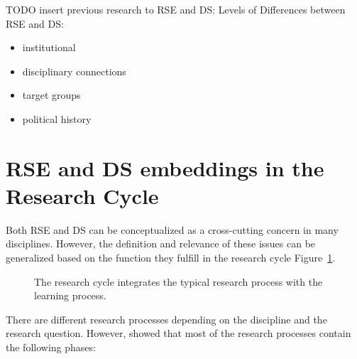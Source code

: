 \documentclass[
        english,biblatex
    ]{lni}
\providecommand{\tightlist}{%
    \setlength{\itemsep}{0pt}\setlength{\parskip}{0pt}}
\begin{document}
    TODO insert previous research to RSE and DS: Levels of Differences
    between RSE and DS:

    \begin{itemize}
    \tightlist
    \item
      institutional
    \item
      disciplinary connections
    \item
      target groups
    \item
      political history
    \end{itemize}

    \section{RSE and DS embeddings in the Research
    Cycle}\label{rse-and-ds-embeddings-in-the-research-cycle}

    Both RSE and DS can be conceptualized as a cross-cutting concern in
    many disciplines. However, the definition and relevance of these
    issues can be generalized based on the function they fulfill in the
    research cycle Figure~\ref{fig-research_cycle}.

    \begin{figure}


    \caption{\label{fig-research_cycle}The research cycle
    \autocite{wildt2009forschendes} integrates the typical research
    process with the learning process.}

    \end{figure}%

    There are different research processes depending on the discipline
    and the research question. However, \autocite{Dehne2021} showed that
    most of the research processes contain the following phases:
\end{document}
